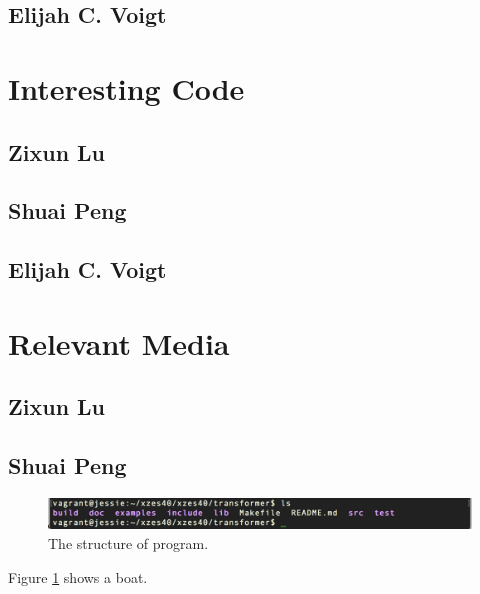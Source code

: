 \subsection{Elijah C. Voigt}

\section{Interesting Code}

\subsection{Zixun Lu}

\subsection{Shuai Peng}

\subsection{Elijah C. Voigt}


\section{Relevant Media}

\subsection{Zixun Lu}

\subsection{Shuai Peng}

\begin{figure}
  \includegraphics[width=\linewidth]{./figures/dir_of_program.png}
  \caption{The structure of program.}
  \label{fig:screen1}
\end{figure}
Figure \ref{fig:screen1} shows a boat.

